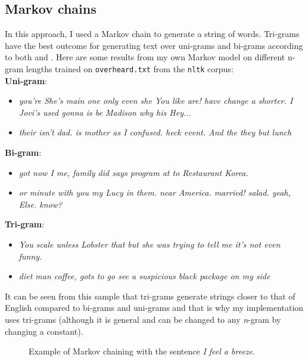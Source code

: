\documentclass{article}
\newcommand{\n}[0]{\\[\baselineskip]}
\begin{document}
\subsection{Markov chains} \label{markov}
In this approach, I used a Markov chain to generate a string of words. Tri-grams have the best outcome for generating text over uni-grams and bi-grams according to both \cite{cheating} and \cite{norvig}. Here are some results from my own Markov model on different n-gram lengths trained on \texttt{overheard.txt} from the \texttt{nltk} corpus:
\n
\textbf{Uni-gram}: 
\begin{itemize}
\item \textit{you're She's main one only even she You like are! have change a shorter. I Jovi's used gonna is be Madison why his Hey...}
\item \textit{their isn't dad. is mother as I confused. heck event. And the they but lunch}
\end{itemize}
\textbf{Bi-gram}:
\begin{itemize}
\item \textit{got now I me, family did says program at to Restaurant Korea.}
\item \textit{or minute with you my Lucy in them. near America. married! salad. yeah, Else. know?}
\end{itemize}
\textbf{Tri-gram}:
\begin{itemize}
\item \textit{You scale unless Lobster that but she was trying to tell me it's not even funny.}
\item \textit{diet man coffee, gots to go see a suspicious black package on my side}
\end{itemize}
It can be seen from this sample that tri-grams generate strings closer to that of English compared to bi-grams and uni-grams and that is why my implementation uses tri-grams (although it is general and can be changed to any \textit{n}-gram by changing a constant).
\begin{figure}[H]
\centering
{}

\caption{Example of Markov chaining with the sentence \textit{I feel a breeze}.}\label{markov-eg1}
\end{figure}
\end{document}
